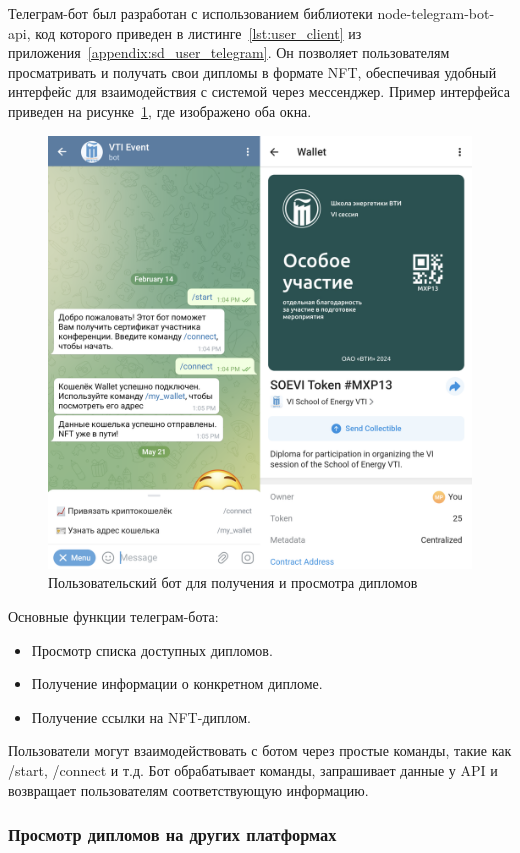 Телеграм-бот был разработан с использованием библиотеки node-telegram-bot-api, код которого приведен в листинге~\ref{lst:user_client} из приложения~\ref{appendix:sd_user_telegram}. Он позволяет пользователям просматривать и получать свои дипломы в формате NFT, обеспечивая удобный интерфейс для взаимодействия с системой через мессенджер. Пример интерфейса приведен на рисунке~\ref{fig:user_client}, где изображено оба окна.

\begin{figure}[H]
	\centering
	\includegraphics[width=.8\textwidth]{images/3.user_client.png}
	\parskip=6pt
	\caption{Пользовательский бот для получения и просмотра дипломов}
	\label{fig:user_client}
\end{figure}

Основные функции телеграм-бота:
\begin{itemize}
    \item Просмотр списка доступных дипломов.
    \item Получение информации о конкретном дипломе.
    \item Получение ссылки на NFT-диплом.
\end{itemize}

Пользователи могут взаимодействовать с ботом через простые команды, такие как /start, /connect и т.д. Бот обрабатывает команды, запрашивает данные у API и возвращает пользователям соответствующую информацию.

\subsubsection{Просмотр дипломов на других платформах}

